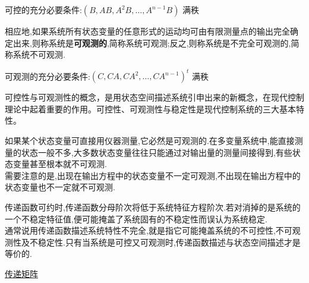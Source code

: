 \documentclass{article}
\begin{document}
可控的充分必要条件:$(B, AB, A^2B, \ldots, A^{n-1}B)$ 满秩

相应地,如果系统所有状态变量的任意形式的运动均可由有限测量点的输出完全确定出来,则称系统是\textbf{可观测的},简称系统可观测;反之,则称系统是不完全可观测的,简称系统不可观测.

可观测的充分必要条件:$(C, CA, CA^2, \ldots, CA^{n-1})^t$ 满秩

可控性与可观测性的概念，是用状态空间描述系统引申出来的新概念，在现代控制理论中起着重要的作用。可控性、可观测性与稳定性是现代控制系统的三大基本特性。

如果某个状态变量可直接用仪器测量,它必然是可观测的.在多变量系统中,能直接测量的状态一般不多,大多数状态变量往往只能通过对输出量的测量间接得到,有些状态变量甚至根本就不可观测.\\
需要注意的是,出现在输出方程中的状态变量不一定可观测,不出现在输出方程中的状态变量也不一定就不可观测.

\bigskip
传递函数可约时,传递函数分母阶次将低于系统特征方程阶次.若对消掉的是系统的一个不稳定特征值,便可能掩盖了系统固有的不稳定性而误认为系统稳定.\\
通常说用传递函数描述系统特性不完全,就是指它可能掩盖系统的不可控性,不可观测性及不稳定性.只有当系统是可控又可观测时,传递函数描述与状态空间描述才是等价的. 

\href{http://www.bulingfei.com/Control/ChineseText/Chapter2Section6.aspx?ChineseChapter2Section6}{传递矩阵}
\end{document}
